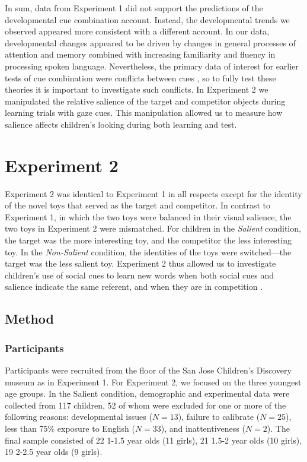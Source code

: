 \documentclass[man,floatsintext]{apa6}
\begin{document}
In sum, data from Experiment 1 did not support the predictions of the developmental cue combination account. Instead, the developmental trends we observed appeared more consistent with a different account. In our data, developmental changes appeared to be driven by changes in general processes of attention and memory combined with increasing familiarity and fluency in processing spoken language. Nevertheless, the primary data of interest for earlier tests of cue combination were conflicts between cues \cite{Hollich2000}, so to fully test these theories it is important to investigate such conflicts. In Experiment 2 we manipulated the relative salience of the target and competitor objects during learning trials with gaze cues. This manipulation allowed us to measure how salience affects children's looking during both learning and test.

\section{Experiment 2}

Experiment 2 was identical to Experiment 1 in all respects except for the identity of the novel toys that served as the target and competitor. In contrast to Experiment 1, in which the two toys were balanced in their visual salience, the two toys in Experiment 2 were mismatched. For children in the \emph{Salient} condition, the target was the more interesting toy, and the competitor the less interesting toy. In the \emph{Non-Salient} condition, the identities of the toys were switched---the target was the less salient toy. Experiment 2 thus allowed us to investigate children's use of social cues to learn new words when both social cues and salience indicate the same referent, and when they are in competition \cite<as in>{Hollich2000,Pruden2006}.

\subsection{Method}

\subsubsection{Participants}

Participants were recruited from the floor of the San Jose Children's Discovery museum as in Experiment 1. For Experiment 2, we focused on the three youngest age groups. In the Salient condition, demographic and experimental data were collected from 117 children, 52 of whom were excluded for one or more of the following reasons: developmental issues ($N= 13$), failure to calibrate ($N=25$), less than 75\% exposure to English ($N=33$), and inattentiveness ($N=2$). The final sample consisted of 22 1-1.5 year olds (11 girls), 21 1.5-2 year olds (10 girls), 19 2-2.5 year olds (9 girls). 
\end{document}
